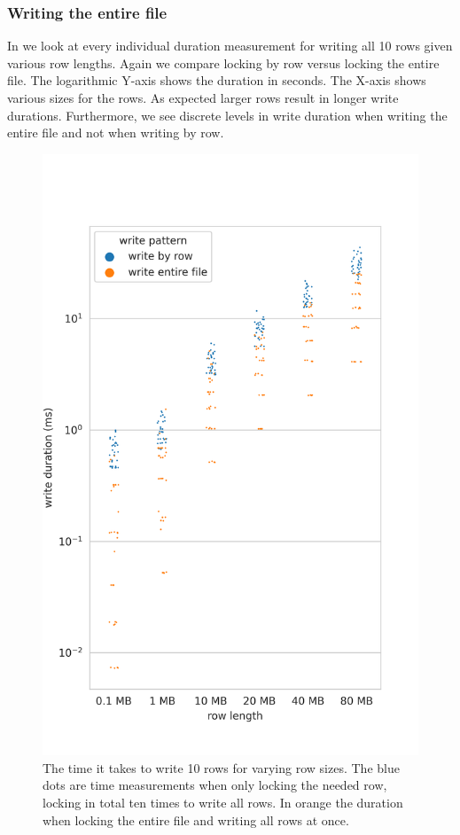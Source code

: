 \subsubsection*{Writing the entire file}
In  we look at every individual duration measurement for writing all 10 rows given various row lengths. Again we compare locking by row versus locking the entire file. The logarithmic Y-axis shows the duration in seconds. The X-axis shows various sizes for the rows. As expected larger rows result in longer write durations. Furthermore, we see discrete levels in write duration when writing the entire file and not when writing by row.
%
\begin{figure}[htbp]
	\centering
	\includegraphics[height=\textheight]{../results/plots/range_vs_row_len.png}
	\caption{The time it takes to write 10 rows for varying row sizes. The blue dots are time measurements when only locking the needed row, locking in total ten times to write all rows. In orange the duration when locking the entire file and writing all rows at once.}
	\label{fig:rowlen}
\end{figure}%

